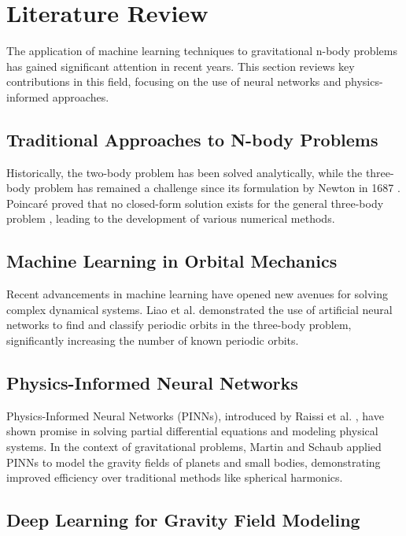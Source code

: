\documentclass[12pt,a4paper]{article}
\begin{document}
\section{Literature Review}
\label{sec:literature}

The application of machine learning techniques to gravitational n-body problems has gained significant attention in recent years. This section reviews key contributions in this field, focusing on the use of neural networks and physics-informed approaches.

\subsection{Traditional Approaches to N-body Problems}

Historically, the two-body problem has been solved analytically, while the three-body problem has remained a challenge since its formulation by Newton in 1687 \cite{newton1687}. Poincaré proved that no closed-form solution exists for the general three-body problem \cite{poincare1890}, leading to the development of various numerical methods.

\subsection{Machine Learning in Orbital Mechanics}

Recent advancements in machine learning have opened new avenues for solving complex dynamical systems. Liao et al. \cite{liao2020} demonstrated the use of artificial neural networks to find and classify periodic orbits in the three-body problem, significantly increasing the number of known periodic orbits.

\subsection{Physics-Informed Neural Networks}

Physics-Informed Neural Networks (PINNs), introduced by Raissi et al. \cite{raissi2019}, have shown promise in solving partial differential equations and modeling physical systems. In the context of gravitational problems, Martin and Schaub \cite{martin2022} applied PINNs to model the gravity fields of planets and small bodies, demonstrating improved efficiency over traditional methods like spherical harmonics.

\subsection{Deep Learning for Gravity Field Modeling}
\end{document}
